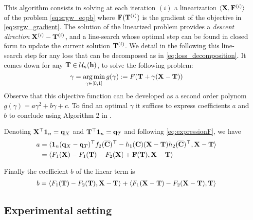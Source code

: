 This algorithm consists in solving at each
iteration $(i)$ a linearization $\langle {\mathbf{X}} , {\mathbf{F}}^{(i)} \rangle$ of the problem \eqref{eq:srgw_eqpb}
where ${\mathbf{F}}({\mathbf{T}}^{(i)})$ is the gradient of the objective in \eqref{eq:srgw_gradient}.  The solution of the linearized problem provides a \emph{descent direction} ${\mathbf{X}}^{(i) }-{\mathbf{T}}^{(i)}$, and a line-search whose optimal step can be found in closed form to
update the current solution ${\mathbf{T}}^{(i)}$. We detail in the following this line-search step for any loss that can be decomposed as in \eqref{eq:loss_decomposition}. It comes down for any ${\mathbf{T}} \in \mathcal{U}_n({\mathbf{h}})$, to solve the following problem:
\begin{equation}
\gamma = \operatorname*{arg\,min}_{\gamma \in [0,1]} g(\gamma) := F({\mathbf{T}} + \gamma ({\mathbf{X}} - {\mathbf{T}}))
\end{equation}
Observe that this objective function can be developed as a second order polynom $g(\gamma) = a \gamma^2 + b \gamma +c$. To find an optimal $\gamma$ it suffices to express coefficients $a$ and $b$ to conclude using Algorithm 2 in \citep{vayer2018optimal}.


Denoting ${\mathbf{X}}^\top \bm{1}_n = {\mathbf{q}}_X$ and ${\mathbf{T}}^\top \bm{1}_n = {\mathbf{q}}_T$ and following \eqref{eq:expressionF}, we have
\begin{equation}
\begin{split}
	a &= \langle  \bm{1}_{n} ({\mathbf{q}}_X - {\mathbf{q}}_T)^\top f_2(\overline{{\mathbf{C}}})^\top - h_1({\mathbf{C}}) ({\mathbf{X}}- {\mathbf{T}}) h_2(\overline{{\mathbf{C}}})^\top , {\mathbf{X}} - {\mathbf{T}} \rangle \\
	&= \langle F_1({\mathbf{X}}) - F_1({\mathbf{T}}) - F_2({\mathbf{X}}) + {\mathbf{F}}({\mathbf{T}}) , {\mathbf{X}} - {\mathbf{T}} \rangle 
\end{split}
\end{equation}

Finally the coefficient $b$ of the linear term is
\begin{equation}
\begin{split}
	b &=  \langle  F_1({\mathbf{T}}) - F_2({\mathbf{T}}) , {\mathbf{X}}-{\mathbf{T}} \rangle + \langle  F_1({\mathbf{X}} - {\mathbf{T}}) - F_2({\mathbf{X}}- {\mathbf{T}}), {\mathbf{T}}  \rangle \\
\end{split}
\end{equation}



\subsection{Experimental setting}\label{sec:implementation_details}

